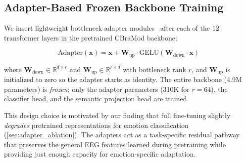 \subsection{Adapter-Based Frozen Backbone Training}
\label{sec:adapters}
\vspace{-1mm}

We insert lightweight bottleneck adapter modules~\cite{houlsby2019adapters} after each of the 12 transformer layers in the pretrained CBraMod backbone:

\begin{equation}
    \text{Adapter}(\mathbf{x}) = \mathbf{x} + \mathbf{W}_{\text{up}} \cdot \text{GELU}(\mathbf{W}_{\text{down}} \cdot \mathbf{x})
\end{equation}

where $\mathbf{W}_{\text{down}} \in \mathbb{R}^{d \times r}$ and $\mathbf{W}_{\text{up}} \in \mathbb{R}^{r \times d}$ with bottleneck rank $r$, and $\mathbf{W}_{\text{up}}$ is initialized to zero so the adapter starts as identity. The entire backbone (4.9M parameters) is \emph{frozen}; only the adapter parameters (310K for $r = 64$), the classifier head, and the semantic projection head are trained.

This design choice is motivated by our finding that full fine-tuning slightly \emph{degrades} pretrained representations for emotion classification (\cref{sec:adapter_ablation}). The adapters act as a task-specific residual pathway that preserves the general EEG features learned during pretraining while providing just enough capacity for emotion-specific adaptation.
